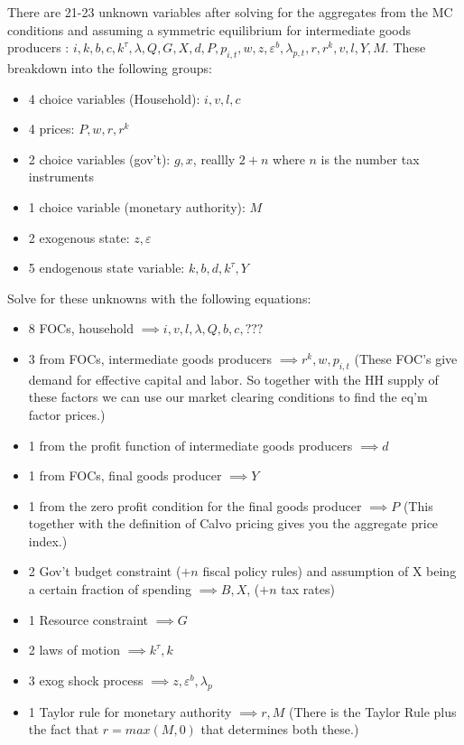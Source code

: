 \documentclass[article,11pt,letterpaper,fleqn]{article}
\theoremstyle{definition}
\numberwithin{equation}{section}
\begin{document}
There are 21-23 unknown variables after solving for the aggregates from the MC conditions and assuming a symmetric equilibrium for intermediate goods producers : $i, k, b, c, k^{\tau}, \lambda, Q, G, X, d, P, p_{i,t}, w, z, \varepsilon^{b}, \lambda_{p,t}, r, r^{k}, v, l, Y, M$.  These breakdown into the following groups:
\begin{itemize}
\item 4 choice variables (Household): $i,v,l,c$
\item 4 prices: $P,w,r,r^{k}$
\item 2 choice variables (gov't): $g,x$, reallly $2+n$ where $n$ is the number tax instruments
\item 1 choice variable (monetary authority): $M$
\item 2 exogenous state: $z,\varepsilon$
\item 5 endogenous state variable: $k,b,d,k^{\tau},Y$
\end{itemize} 

Solve for these unknowns with the following equations:
\begin{itemize}
\item 8 FOCs, household $\implies i,v,l,\lambda,Q,b,c,???$
\item 3 from FOCs, intermediate goods producers $\implies r^{k},w,p_{i,t}$ (These FOC's give demand for effective capital and labor.  So together with the HH supply of these factors we can use our market clearing conditions to find the eq'm factor prices.)
\item 1 from the profit function of intermediate goods producers $\implies d$
\item 1 from FOCs, final goods producer $\implies Y$
\item 1 from the zero profit condition for the final goods producer $\implies P$ (This together with the definition of Calvo pricing gives you the aggregate price index.)
\item 2 Gov't budget constraint ($+n$ fiscal policy rules) and assumption of X being a certain fraction of spending $\implies B, X$, ($+n$ tax rates)
\item 1 Resource constraint $\implies G$
\item 2 laws of motion $\implies k^{\tau},k$
\item 3 exog shock process $\implies z,\varepsilon^{b},\lambda_{p}$
\item 1 Taylor rule for monetary authority $\implies r,M$ (There is the Taylor Rule plus the fact that $r=max(M,0)$ that determines both these.)
\end{itemize}
\end{document}
